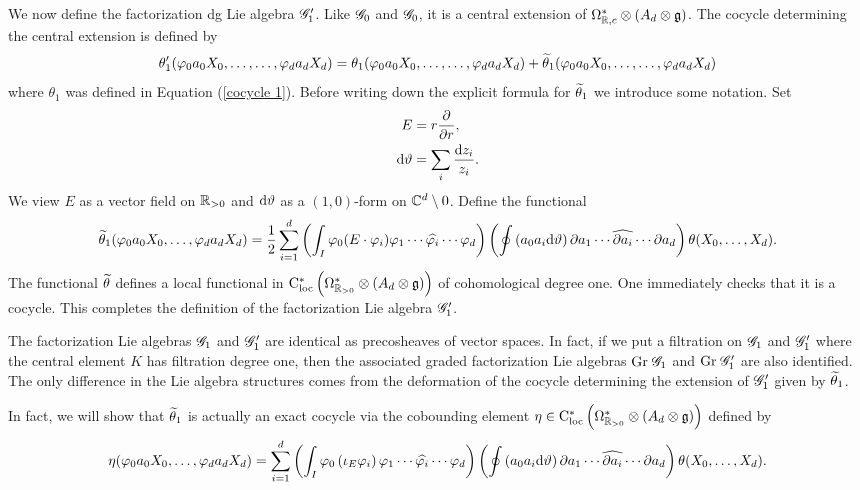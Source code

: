 We now define the factorization dg Lie algebra $\sG_1'$. Like $\sG_0$ and $\sG_0$, it is a central extension of $\Omega^*_{\RR,c} \tensor (A_d \tensor \fg)$. The cocycle determining the central extension is defined by
\[
\theta_1' (\varphi_0 a_0 X_0, \ldots, \ldots, \varphi_d a_dX_d) = \theta_1(\varphi_0 a_0 X_0, \ldots, \ldots, \varphi_d a_dX_d) + \Tilde{\theta}_1(\varphi_0 a_0 X_0, \ldots, \ldots, \varphi_d a_dX_d) 
\]
where $\theta_1$ was defined in Equation (\ref{cocycle 1}). Before writing down the explicit formula for $\Tilde{\theta}_1$ we introduce some notation. Set
\begin{align*}
E & = r \frac{\partial}{\partial r} , \\
\d \vartheta & = \sum_i \frac{\d z_i}{z_i} .
\end{align*} 
We view $E$ as a vector field on $\RR_{>0}$ and $\d \vartheta$ as a $(1,0)$-form on $\CC^{d} \setminus 0$. Define the functional
\[
\Tilde{\theta}_1(\varphi_0 a_0 X_0,\ldots,\varphi_d a_d X_d) = \frac{1}{2} \sum_{i=1}^{d} \left( \int_I \varphi_0 (E \cdot \varphi_i) \varphi_1\cdots \Hat{\varphi_i} \cdots \varphi_{d}\right)\left(\oint \left(a_0 a_i \d \vartheta\right) \partial a_1 \cdots \Hat{\partial a_i} \cdots \partial a_d \right) \theta(X_0,\ldots,X_d)  .
\]
The functional $\Tilde{\theta}$ defines a local functional in $\cloc^*\left(\Omega^*_{\RR_{>0}} \tensor (A_d \tensor \fg) \right)$ of cohomological degree one. One immediately checks that it is a cocycle. This completes the definition of the factorization Lie algebra $\sG_1'$. 

The factorization Lie algebras $\sG_1$ and $\sG_1'$ are identical as precosheaves of vector spaces. In fact, if we put a filtration on $\sG_1$ and $\sG_1'$ where the central element $K$ has filtration degree one, then the associated graded factorization Lie algebras ${\rm Gr} \; \sG_1$ and ${\rm Gr} \; \sG_1'$ are also identified. The only difference in the Lie algebra structures comes from the deformation of the cocycle determining the extension of $\sG_1'$ given by $\Tilde{\theta}_1$. 

In fact, we will show that $\Tilde{\theta}_1$ is actually an exact cocycle via the cobounding element $\eta \in \cloc^*\left(\Omega^*_{\RR_{>0}} \tensor (A_d \tensor \fg)\right)$ defined by
\[
\eta(\varphi_0a_0X_0,\ldots,\varphi_da_dX_d) = \sum_{i=1}^d \left(\int_I \varphi_0 \left(\iota_{E} \varphi_i \right) \varphi_1 \cdots \Hat{\varphi_i} \cdots \varphi_d\right)\left(\oint \left(a_0 a_i \d \vartheta\right) \partial a_1 \cdots \Hat{\partial a_i} \cdots \partial a_d \right) \theta(X_0,\ldots,X_d)  .
\]

